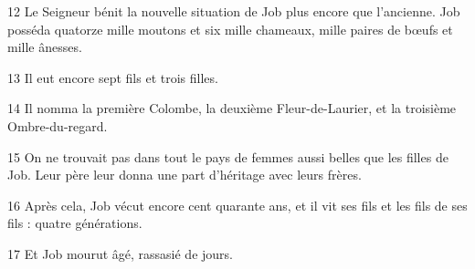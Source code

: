 
12 Le Seigneur bénit la nouvelle situation de Job plus encore que l’ancienne. Job posséda quatorze mille moutons et six mille chameaux, mille paires de bœufs et mille ânesses.

13 Il eut encore sept fils et trois filles.

14 Il nomma la première Colombe, la deuxième Fleur-de-Laurier, et la troisième Ombre-du-regard.

15 On ne trouvait pas dans tout le pays de femmes aussi belles que les filles de Job. Leur père leur donna une part d’héritage avec leurs frères.

16 Après cela, Job vécut encore cent quarante ans, et il vit ses fils et les fils de ses fils : quatre générations.

17 Et Job mourut âgé, rassasié de jours.